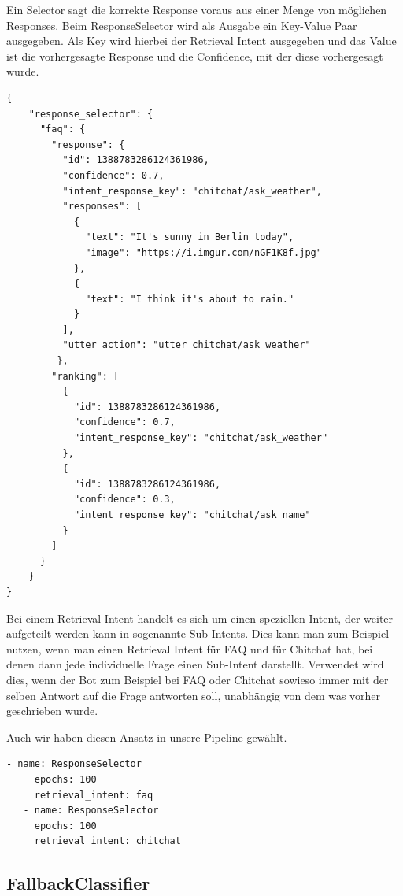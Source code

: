 Ein Selector sagt die korrekte Response voraus aus einer Menge von möglichen Responses.
Beim ResponseSelector wird als Ausgabe ein Key-Value Paar ausgegeben.
Als Key wird hierbei der Retrieval Intent ausgegeben und das Value ist die vorhergesagte Response und die Confidence, mit der diese vorhergesagt wurde.\cite{responseSelector}

\begin{lstlisting}[label={lst: ResponseSelector}]
{
    "response_selector": {
      "faq": {
        "response": {
          "id": 1388783286124361986,
          "confidence": 0.7,
          "intent_response_key": "chitchat/ask_weather",
          "responses": [
            {
              "text": "It's sunny in Berlin today",
              "image": "https://i.imgur.com/nGF1K8f.jpg"
            },
            {
              "text": "I think it's about to rain."
            }
          ],
          "utter_action": "utter_chitchat/ask_weather"
         },
        "ranking": [
          {
            "id": 1388783286124361986,
            "confidence": 0.7,
            "intent_response_key": "chitchat/ask_weather"
          },
          {
            "id": 1388783286124361986,
            "confidence": 0.3,
            "intent_response_key": "chitchat/ask_name"
          }
        ]
      }
    }
}
\end{lstlisting}

Bei einem Retrieval Intent handelt es sich um einen speziellen Intent, der weiter aufgeteilt werden kann in sogenannte Sub-Intents.
Dies kann man zum Beispiel nutzen, wenn man einen Retrieval Intent für FAQ und für Chitchat hat, bei denen dann jede individuelle Frage einen Sub-Intent darstellt.\cite{retrievalIntent}
Verwendet wird dies, wenn der Bot zum Beispiel bei FAQ oder Chitchat sowieso immer mit der selben Antwort auf die Frage antworten soll, unabhängig von dem was vorher geschrieben wurde.\cite{chitchatAndFaqs}

Auch wir haben diesen Ansatz in unsere Pipeline gewählt.

\begin{lstlisting}[label={lst: Two ResponseSelectors in our Pipeline}]
- name: ResponseSelector
     epochs: 100
     retrieval_intent: faq
   - name: ResponseSelector
     epochs: 100
     retrieval_intent: chitchat
\end{lstlisting}

\subsection{FallbackClassifier}

